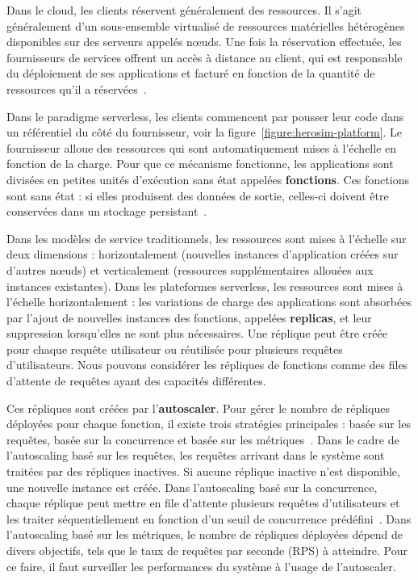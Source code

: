 Dans le cloud, les clients réservent généralement des ressources. Il s'agit généralement d'un sous-ensemble virtualisé de ressources matérielles hétérogènes disponibles sur des serveurs appelés nœuds. Une fois la réservation effectuée, les fournisseurs de services offrent un accès à distance au client, qui est responsable du déploiement de ses applications et facturé en fonction de la quantité de ressources qu'il a réservées~\cite{Lannurien2023}.

Dans le paradigme serverless, les clients commencent par pousser leur code dans un référentiel du côté du fournisseur, voir la figure~\ref{figure:herosim-platform}. Le fournisseur alloue des ressources qui sont automatiquement mises à l'échelle en fonction de la charge. Pour que ce mécanisme fonctionne, les applications sont divisées en petites unités d'exécution sans état appelées \textbf{fonctions}. Ces fonctions sont sans état : si elles produisent des données de sortie, celles-ci doivent être conservées dans un stockage persistant~\cite{yuFollowingDataNot}.

Dans les modèles de service traditionnels, les ressources sont mises à l'échelle sur deux dimensions : horizontalement (nouvelles instances d'application créées sur d'autres nœuds) et verticalement (ressources supplémentaires allouées aux instances existantes). Dans les plateformes serverless, les ressources sont mises à l'échelle horizontalement : les variations de charge des applications sont absorbées par l'ajout de nouvelles instances des fonctions, appelées \textbf{replicas}, et leur suppression lorsqu'elles ne sont plus nécessaires. Une réplique peut être créée pour chaque requête utilisateur ou réutilisée pour plusieurs requêtes d'utilisateurs. Nous pouvons considérer les répliques de fonctions comme des files d'attente de requêtes ayant des capacités différentes.

Ces répliques sont créées par l'\textbf{autoscaler}. Pour gérer le nombre de répliques déployées pour chaque fonction, il existe trois stratégies principales : basée sur les requêtes, basée sur la concurrence et basée sur les métriques~\cite{mahmoudiSimFaaSPerformanceSimulator2021}. Dans le cadre de l'autoscaling basé sur les requêtes, les requêtes arrivant dans le système sont traitées par des répliques inactives. Si aucune réplique inactive n'est disponible, une nouvelle instance est créée. Dans l'autoscaling basé sur la concurrence, chaque réplique peut mettre en file d'attente plusieurs requêtes d'utilisateurs et les traiter séquentiellement en fonction d'un seuil de concurrence prédéfini~\cite{herofake}. Dans l'autoscaling basé sur les métriques, le nombre de répliques déployées dépend de divers objectifs, tels que le taux de requêtes par seconde (RPS) à atteindre. Pour ce faire, il faut surveiller les performances du système à l'usage de l'autoscaler.

